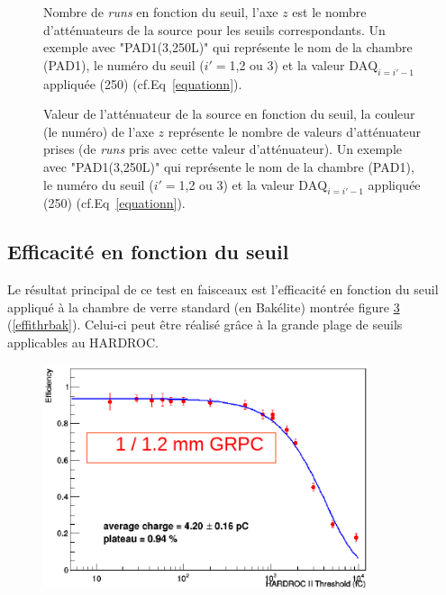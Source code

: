 \begin{figure}[ht!]
	\centering
	\caption{Nombre de \textit{runs} en fonction du seuil, l'axe $z$ est le nombre d'atténuateurs de la source pour les seuils correspondants. Un exemple avec "PAD1(3,250L)" qui représente le nom de la chambre (PAD1), le numéro du seuil ($i'=$1,2 ou 3) et la valeur $\mbox{DAQ}_{i=i'-1}$ appliquée (250) (cf.Eq~\ref{equationn}).}
	\label{elogutil3}	
\end{figure}

\begin{figure}[ht!]
	\centering
	\caption{Valeur de l'atténuateur de la source en fonction du seuil, la couleur (le numéro) de l'axe $z$ représente le nombre de valeurs d'atténuateur prises (de \textit{runs} pris avec cette valeur d'atténuateur). Un exemple avec "PAD1(3,250L)" qui représente le nom de la chambre (PAD1), le numéro du seuil ($i'=$1,2 ou 3) et la valeur $\mbox{DAQ}_{i=i'-1}$ appliquée (250) (cf.Eq~\ref{equationn}).}
	\label{elogutil4}	
\end{figure}

\subsection{Efficacité en fonction du seuil}
Le résultat principal de ce test en faisceaux est l'efficacité en fonction du seuil appliqué à la chambre de verre standard (en Bakélite) montrée figure \ref{effithrchi} (\ref{effithrbak}). Celui-ci peut être réalisé grâce à la grande plage de seuils applicables au HARDROC.

\begin{figure}[ht!]
	\centering
	\includegraphics[width=0.85\textwidth]{GLA/effithrchi.png}
	\label{effithrchi}
\end{figure}

